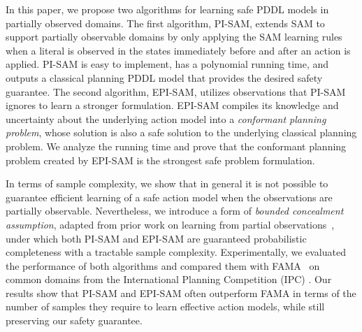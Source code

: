 \documentclass[letterpaper]{article} %
\newcommand{\roni}[1]{ }
\begin{document}
In this paper, we propose two algorithms for learning safe PDDL models in partially observed domains.
The first algorithm, PI-SAM, extends SAM \citep{juba2021safe}
to support partially observable domains by only applying the SAM learning rules  when a literal is observed in the states immediately before and after an action is applied.
PI-SAM is easy to implement, has a polynomial running time, and outputs a classical planning PDDL model that provides the desired safety guarantee.
The second algorithm, EPI-SAM, utilizes observations that PI-SAM ignores to learn a stronger formulation. EPI-SAM compiles its knowledge and uncertainty about the underlying action model into a \emph{conformant planning problem}, whose solution is also a safe solution to the underlying classical planning problem.
We analyze the running time and prove that the conformant planning problem created by EPI-SAM is the strongest safe problem formulation.


In terms of sample complexity, we show that in general it is not possible to guarantee efficient learning of a safe action model when the observations are partially observable.
Nevertheless, we introduce a form of \textit{bounded concealment assumption}, adapted from prior work on learning from partial observations~\citep{michael2010partialObservability}, under which both PI-SAM and EPI-SAM are guaranteed probabilistic completeness with a tractable sample complexity.
Experimentally, we evaluated the performance of both algorithms and compared them with FAMA~\citep{aineto2019learning} on common domains from the International Planning Competition (IPC) \citep{ipc}.
Our results show that PI-SAM and EPI-SAM often outperform FAMA in terms of the number of samples they require to learn effective action models, while still preserving our safety guarantee.







\end{document}
